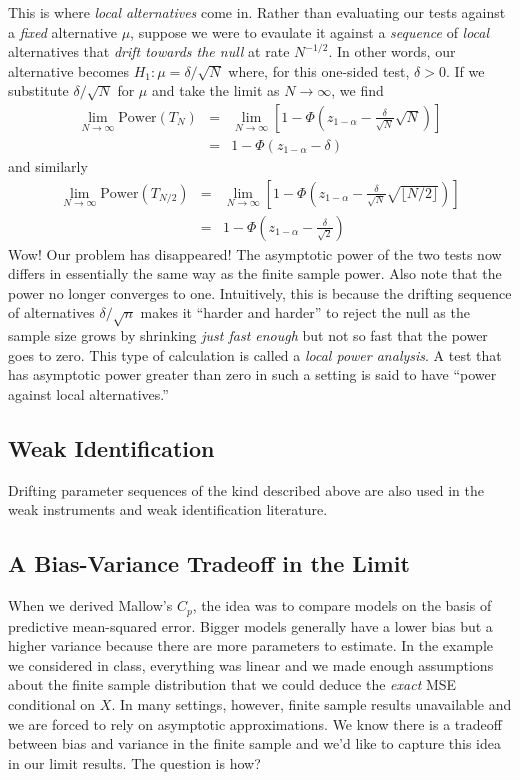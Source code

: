 \documentclass[12pt]{article}
\theoremstyle{definition}
\begin{document}
This is where \emph{local alternatives} come in. Rather than evaluating our tests against a \emph{fixed} alternative $\mu$, suppose we were to evaulate it against a \emph{sequence} of \emph{local} alternatives that \emph{drift towards the null} at rate $N^{-1/2}$. In other words, our alternative becomes $H_1 \colon \mu = \delta / \sqrt{N}$ where, for this one-sided test, $\delta > 0$. If we substitute $\delta/\sqrt{N}$ for $\mu$ and take the limit as $N\rightarrow \infty$, we find
\begin{eqnarray*}
\lim_{N\rightarrow \infty} \mbox{Power}(T_{N}) &=& \lim_{N\rightarrow \infty}\left[1 - \Phi\left(z_{1-\alpha} - \frac{\delta}{\sqrt{N}}\sqrt{N}\right) \right]\\
&=& 1 - \Phi\left(z_{1-\alpha} - \delta \right)
\end{eqnarray*}
and similarly
\begin{eqnarray*}
\lim_{N\rightarrow \infty} \mbox{Power}(T_{N/2}) &=& \lim_{N\rightarrow \infty}\left[1 - \Phi\left(z_{1-\alpha} - \frac{\delta}{\sqrt{N}}\sqrt{\lfloor N/2 \rfloor }\right) \right]\\
&=& 1 - \Phi\left(z_{1-\alpha} - \frac{\delta}{\sqrt{2}} \right)
\end{eqnarray*}
Wow! Our problem has disappeared! The asymptotic power of the two tests now differs in essentially the same way as the finite sample power. Also note that the power no longer converges to one. Intuitively, this is because the drifting sequence of alternatives $\delta/\sqrt{n}$ makes it ``harder and harder'' to reject the null as the sample size grows by shrinking \emph{just fast enough} but not so fast that the power goes to zero. This type of calculation is called a \emph{local power analysis}. A test that has asymptotic power greater than zero in such a setting is said to have ``power against local alternatives.''


\subsection{Weak Identification}
Drifting parameter sequences of the kind described above are also used in the weak instruments and weak identification literature.

\subsection{A Bias-Variance Tradeoff in the Limit}
When we derived Mallow's $C_p$, the idea was to compare models on the basis of predictive mean-squared error. Bigger models generally have a lower bias but a higher variance because there are more parameters to estimate. In the example we considered in class, everything was linear and we made enough assumptions about the finite sample distribution that we could deduce the \emph{exact} MSE conditional on $X$. In many settings, however, finite sample results unavailable and we are forced to rely on asymptotic approximations. We know there is a tradeoff between bias and variance in the finite sample and we'd like to capture this idea in our limit results. The question is how?
\end{document}
